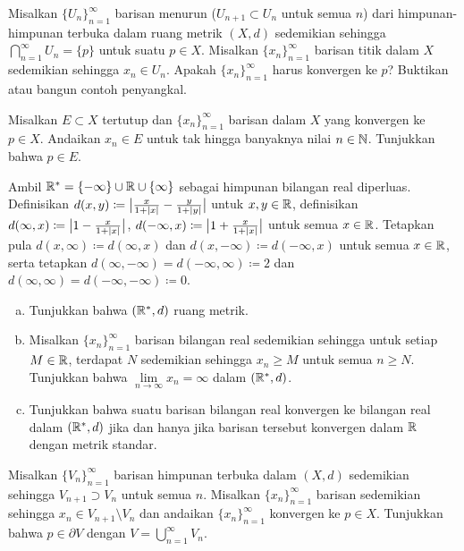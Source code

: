 \begin{exercise}[Menantang]
Misalkan $\{ U_n \}_{n=1}^\infty$ barisan menurun ($U_{n+1} \subset U_n$ untuk
semua $n$) dari himpunan-himpunan terbuka dalam ruang metrik $(X,d)$ sedemikian sehingga
$\bigcap_{n=1}^\infty U_n = \{ p \}$ untuk suatu $p \in X$.  Misalkan 
$\{ x_n \}_{n=1}^\infty$ barisan titik dalam $X$ sedemikian sehingga $x_n \in U_n$.  Apakah
$\{ x_n \}_{n=1}^\infty$ harus konvergen ke $p$?  Buktikan atau bangun contoh penyangkal.
\end{exercise}

\begin{exercise}
Misalkan $E \subset X$ tertutup dan
$\{ x_n \}_{n=1}^\infty$ barisan dalam $X$ yang konvergen ke $p \in X$.  Andaikan
$x_n \in E$ untuk tak hingga banyaknya nilai $n \in {\mathbb{N}}$.  Tunjukkan bahwa $p \in E$.
\end{exercise}

\begin{exercise} \label{exercise:extendedrealsmetric}
Ambil ${\mathbb{R}}^* = \{ -\infty \} \cup {\mathbb{R}} \cup \{ \infty \}$ sebagai himpunan bilangan real diperluas.
Definisikan
$d(x,y) \coloneqq \bigl\lvert { \frac{x}{1+\lvert {x} \rvert} - \frac{y}{1+\lvert {y} \rvert} } \bigr\rvert$
untuk $x, y \in {\mathbb{R}}$, definisikan
$d(\infty,x) \coloneqq \bigl\lvert { 1 - \frac{x}{1+\lvert {x} \rvert} } \bigr\rvert$,
$d(-\infty,x) \coloneqq \bigl\lvert { 1 + \frac{x}{1+\lvert {x} \rvert} } \bigr\rvert$
untuk semua $x \in {\mathbb{R}}$.  Tetapkan pula $d(x,\infty) \coloneqq d(\infty,x)$ dan
$d(x,-\infty) \coloneqq d(-\infty,x)$ untuk semua $x \in {\mathbb{R}}$, serta tetapkan
$d(\infty,-\infty)=d(-\infty,\infty) \coloneqq 2$ dan $d(\infty,\infty)=d(-\infty,-\infty) \coloneqq 0$.
\begin{enumerate}[a)]
\item
Tunjukkan bahwa $({\mathbb{R}}^*,d)$ ruang metrik.
\item
Misalkan $\{ x_n \}_{n=1}^\infty$ barisan bilangan real sedemikian sehingga
untuk setiap $M \in {\mathbb{R}}$, terdapat $N$ sedemikian sehingga
$x_n \geq M$ untuk semua $n \geq N$.  Tunjukkan bahwa $\lim\limits_{n\to\infty} x_n = \infty$ dalam
$({\mathbb{R}}^*,d)$.
\item
Tunjukkan bahwa suatu barisan bilangan real konvergen ke bilangan real
dalam $({\mathbb{R}}^*,d)$ jika dan
hanya jika barisan tersebut konvergen dalam ${\mathbb{R}}$ dengan metrik standar.
\end{enumerate}
\end{exercise}

\begin{exercise}
Misalkan $\{ V_n \}_{n=1}^\infty$ barisan himpunan terbuka
dalam $(X,d)$
sedemikian sehingga $V_{n+1} \supset V_n$ untuk semua $n$.  Misalkan $\{ x_n \}_{n=1}^\infty$ barisan
sedemikian sehingga $x_n \in V_{n+1} \setminus V_n$ dan andaikan 
$\{ x_n \}_{n=1}^\infty$ konvergen ke $p \in X$.  Tunjukkan bahwa $p \in \partial V$
dengan $V = \bigcup_{n=1}^\infty V_n$.
\end{exercise}

